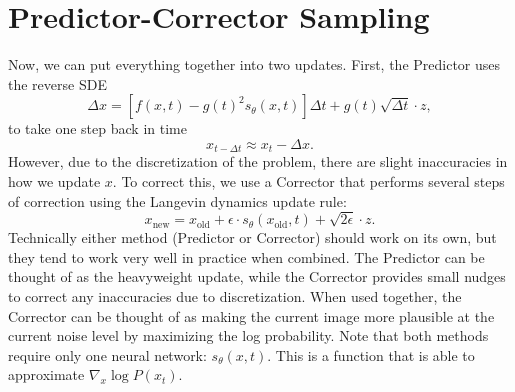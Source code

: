 \documentclass{article}
\begin{document}
\section{Predictor-Corrector Sampling}
Now, we can put everything together into two updates. First, the Predictor uses the reverse SDE
\[\Delta x= [f(x,t)-g(t)^2s_\theta (x,t)]\Delta t + g(t) \sqrt{\Delta t} \cdot z,\]
to take one step back in time
\[x_{t-\Delta t}\approx x_t - \Delta x.\]
However, due to the discretization of the problem, there are slight inaccuracies in how we update $x$. To correct this, we use a Corrector that performs several steps of correction using the Langevin dynamics update rule:
\[x_{\text{new}} = x_{\text{old}} + \epsilon \cdot s_\theta (x_{\text{old}}, t) + \sqrt{2\epsilon} \cdot z.\]
Technically either method (Predictor or Corrector) should work on its own, but they tend to work very well in practice when combined. The Predictor can be thought of as the heavyweight update, while the Corrector provides small nudges to correct any inaccuracies due to discretization. When used together, the Corrector can be thought of as making the current image more plausible at the current noise level by maximizing the log probability. Note that both methods require only one neural network: $s_\theta (x,t)$. This is a function that is able to approximate $\nabla_x \log P(x_t)$. 


\end{document}
